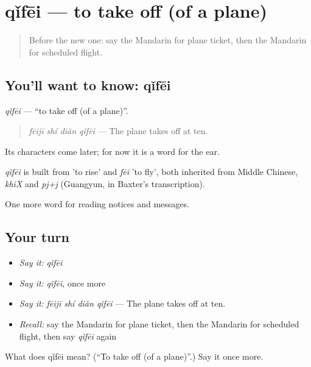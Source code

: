 \section[qǐfēi]{qǐfēi — to take off (of a plane)}

\label{lesson:ZH-C196-qifei}



\begin{quote}
Before the new one: say the Mandarin for plane ticket, then the Mandarin for scheduled flight.
\end{quote}

\subsection*{You'll want to know: qǐfēi}
\emph{qǐfēi} — \textquotedblleft{}to take off (of a plane)\textquotedblright{}.

\begin{quote}
\emph{fēijī shí diǎn qǐfēi} — The plane takes off at ten.
\end{quote}

Its characters come later; for now it is a word for the ear.

\begin{cousinweb}
\emph{qǐfēi} is built from  'to rise' and \emph{fēi} 'to fly', both inherited from Middle Chinese, \emph{khiX} and \emph{pj+j} (Guangyun, in Baxter's transcription).
\end{cousinweb}

\begin{grammarlens}[title={What you've built}]
One more word for reading notices and messages.
\end{grammarlens}

\subsection*{Your turn}
\begin{itemize}
\raggedright
  \item \emph{Say it:} \emph{qǐfēi}
  \item \emph{Say it:} \emph{qǐfēi}, once more
  \item \emph{Say it:} \emph{fēijī shí diǎn qǐfēi} — The plane takes off at ten.
  \item \emph{Recall:} say the Mandarin for plane ticket, then the Mandarin for scheduled flight, then say \emph{qǐfēi} again
\end{itemize}

\begin{tcolorbox}[breakable,colback=teal!4,colframe=teal!35!black,title={Before you move on}]
What does qǐfēi mean? (\textquotedblleft{}To take off (of a plane)\textquotedblright{}.) Say it once more.
\end{tcolorbox}
